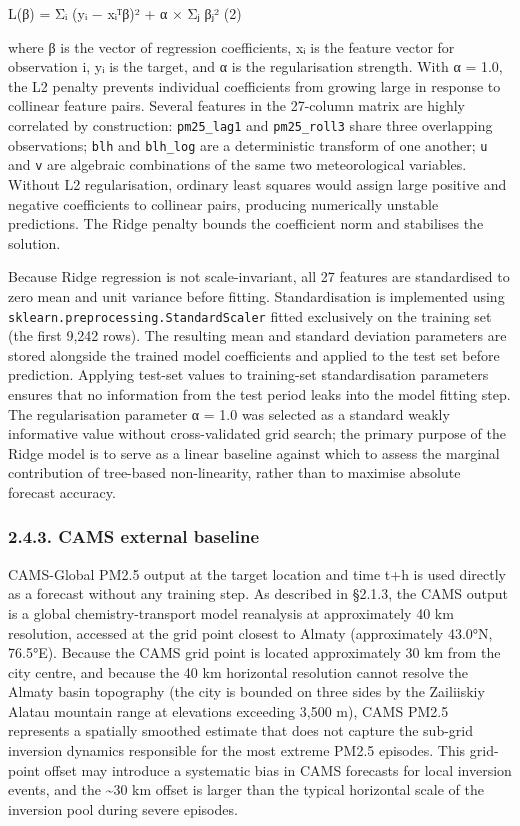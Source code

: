 L(β) = Σᵢ (yᵢ − xᵢᵀβ)² + α × Σⱼ βⱼ² (2)

where β is the vector of regression coefficients, xᵢ is the feature vector for observation i, yᵢ is the target, and α is the regularisation strength. With α = 1.0, the L2 penalty prevents individual coefficients from growing large in response to collinear feature pairs. Several features in the 27-column matrix are highly correlated by construction: \texttt{pm25\_lag1} and \texttt{pm25\_roll3} share three overlapping observations; \texttt{blh} and \texttt{blh\_log} are a deterministic transform of one another; \texttt{u} and \texttt{v} are algebraic combinations of the same two meteorological variables. Without L2 regularisation, ordinary least squares would assign large positive and negative coefficients to collinear pairs, producing numerically unstable predictions. The Ridge penalty bounds the coefficient norm and stabilises the solution.

Because Ridge regression is not scale-invariant, all 27 features are standardised to zero mean and unit variance before fitting. Standardisation is implemented using \texttt{sklearn.preprocessing.StandardScaler} fitted exclusively on the training set (the first 9,242 rows). The resulting mean and standard deviation parameters are stored alongside the trained model coefficients and applied to the test set before prediction. Applying test-set values to training-set standardisation parameters ensures that no information from the test period leaks into the model fitting step. The regularisation parameter α = 1.0 was selected as a standard weakly informative value without cross-validated grid search; the primary purpose of the Ridge model is to serve as a linear baseline against which to assess the marginal contribution of tree-based non-linearity, rather than to maximise absolute forecast accuracy.

\subsubsection{2.4.3. CAMS external baseline}\label{cams-external-baseline}

CAMS-Global PM2.5 output at the target location and time t+h is used directly as a forecast without any training step. As described in §2.1.3, the CAMS output is a global chemistry-transport model reanalysis at approximately 40 km resolution, accessed at the grid point closest to Almaty (approximately 43.0°N, 76.5°E). Because the CAMS grid point is located approximately 30 km from the city centre, and because the 40 km horizontal resolution cannot resolve the Almaty basin topography (the city is bounded on three sides by the Zailiiskiy Alatau mountain range at elevations exceeding 3,500 m), CAMS PM2.5 represents a spatially smoothed estimate that does not capture the sub-grid inversion dynamics responsible for the most extreme PM2.5 episodes. This grid-point offset may introduce a systematic bias in CAMS forecasts for local inversion events, and the \textasciitilde30 km offset is larger than the typical horizontal scale of the inversion pool during severe episodes.

